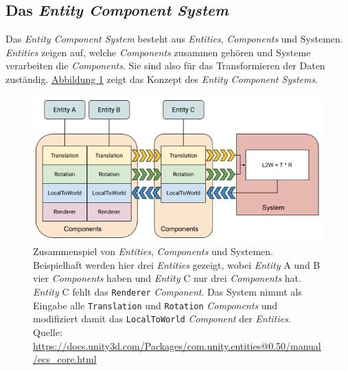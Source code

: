 \subsection{Das \textit{Entity Component System}} \label{ecs}
Das \textit{Entity Component System} besteht aus \textit{Entities}, \textit{Components} und Systemen. \textit{Entities} zeigen auf, welche \textit{Components} zusammen gehören und Systeme verarbeiten die \textit{Components}. Sie sind also für das Transformieren der Daten zuständig. \hyperref[fig:ecs_concept]{Abbildung \ref*{fig:ecs_concept}} zeigt das Konzept des \textit{Entity Component Systems}.
\begin{figure}[H]
\begin{center}
\includegraphics[scale=0.8]{Bilder/ECSConcept.png}
\caption[Zusammenspiel von \textit{Entities}, \textit{Components} und Systemen]{Zusammenspiel von \textit{Entities}, \textit{Components} und Systemen. Beispielhaft werden hier drei \textit{Entities} gezeigt, wobei \textit{Entity} A und B vier \textit{Components} haben und \textit{Entity} C nur drei \textit{Components} hat. \textit{Entity} C fehlt das \texttt{Renderer} \textit{Component}. Das System nimmt als Eingabe alle \texttt{Translation} und \texttt{Rotation} \textit{Components} und modifiziert damit das \texttt{LocalToWorld} \textit{Component} der \textit{Entities}.\\
\footnotesize{Quelle: \url{https://docs.unity3d.com/Packages/com.unity.entities@0.50/manual/ecs_core.html}}}
\label{fig:ecs_concept}
\end{center}
\end{figure}
